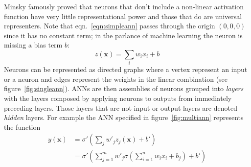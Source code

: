 %
Minsky \etal\cite{minsky2017perceptrons} famously proved that neurons that don't include a non-linear activation function have very little representational power and those that do are universal representers.
%
Note that eqn.~\eqref{eqn:simpleann} passes through the origin \((0,0,0)\) since it has no constant term; in the parlance of machine learning the neuron is missing a bias term \(b\):
\begin{equation}
    z(\mathbf{x}) = \sum_i w_i x_i + b
    \label{eqn:linearregr}
\end{equation}
%
Neurons can be represented as directed graphs where a vertex represent an input or a neuron and edges represent the weights in the linear combination (see figure~\ref{fig:singleann}).
%
ANNs are then assemblies of neurons grouped into \textit{layers} with the layers composed by applying neurons to outputs from immediately preceding layers.
%
Those layers that are not input or output layers are denoted \textit{hidden} layers.
%
For example the ANN specified in figure~\ref{fig:multiann} represents the function
\begin{equation}
    \begin{split}
        y(\mathbf{x}) &= \sigma' \left( \sum_j w'_j z_j(\mathbf{x}) + b' \right) \\
        &=  \sigma' \left( \sum_{j=1}^m w'_j \sigma\left(\sum_{i=1}^n w_i x_i + b_j\right) + b' \right)
    \end{split}
\end{equation}

